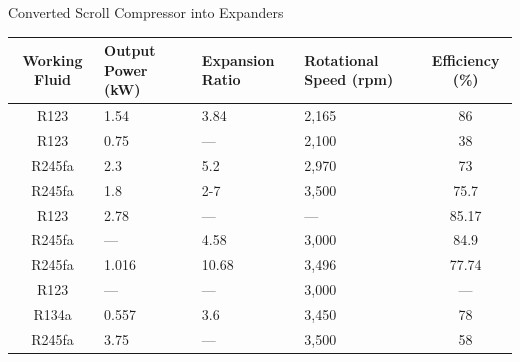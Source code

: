 \begin{frame}{Converted Scroll Compressor into Expanders\cite{zhao2019expansion}}
    \begin{table}[h]
        \centering
        \begin{tabular}{cp{2.5cm}p{2.25cm}p{2.5cm}c}
        \hline
            Working Fluid & Output Power (kW) & Expansion Ratio & Rotational Speed (rpm) & Efficiency (\%) \\
            \hline
            R123 & 1.54 & 3.84 & 2,165 & 86 \\
            R123 & 0.75 & --- & 2,100 & 38 \\
            R245fa & 2.3 & 5.2 & 2,970 & 73 \\
            R245fa & 1.8 & 2-7 & 3,500 & 75.7 \\
            R123 & 2.78 & --- & --- & 85.17 \\
            R245fa & --- & 4.58 & 3,000 & 84.9 \\
            R245fa & 1.016 & 10.68 & 3,496 & 77.74 \\
            R123 & --- & --- & 3,000 & --- \\
            R134a & 0.557 & 3.6 & 3,450 & 78 \\
            R245fa & 3.75 & --- & 3,500 & 58 \\
            \hline
        \end{tabular}
    \end{table}
\end{frame}
